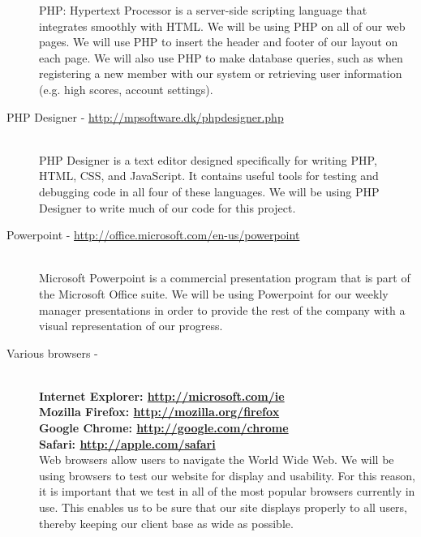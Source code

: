 \begin{description}
			PHP: Hypertext Processor is a server-side scripting language that integrates smoothly with HTML. We will be using PHP on all of our web pages. We will use PHP to insert the header and footer of our layout on each page. We will also use PHP to make database queries, such as when registering a new member with our system or retrieving user information (e.g. high scores, account settings).
		\item[PHP Designer - \url{http://mpsoftware.dk/phpdesigner.php}] \hfill \\
			PHP Designer is a text editor designed specifically for writing PHP, HTML, CSS, and JavaScript. It contains useful tools for testing and debugging code in all four of these languages. We will be using PHP Designer to write much of our code for this project.
		\item[Powerpoint - \url{http://office.microsoft.com/en-us/powerpoint}] \hfill \\
			Microsoft Powerpoint is a commercial presentation program that is part of the Microsoft Office suite. We will be using Powerpoint for our weekly manager presentations in order to provide the rest of the company with a visual representation of our progress.
		\item[Various browsers -] \hfill \\
		\textbf{ Internet Explorer: \url{http://microsoft.com/ie} \\
		Mozilla Firefox: \url{http://mozilla.org/firefox} \\
		Google Chrome: \url{http://google.com/chrome} \\
		Safari: \url{http://apple.com/safari} }\\
			Web browsers allow users to navigate the World Wide Web. We will be using browsers to test our website for display and usability. For this reason, it is important that we test in all of the most popular browsers currently in use. This enables us to be sure that our site displays properly to all users, thereby keeping our client base as wide as possible.
			
	\end{description}
